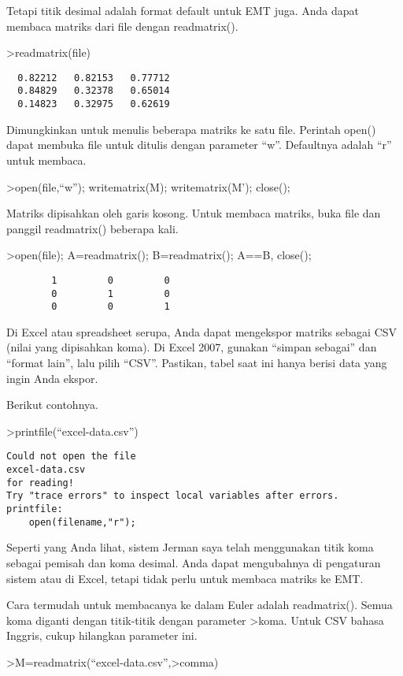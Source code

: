 \documentclass[
]{book}
\begin{document}
Tetapi titik desimal adalah format default untuk EMT juga. Anda dapat membaca matriks dari file dengan readmatrix().

\textgreater readmatrix(file)

\begin{verbatim}
  0.82212   0.82153   0.77712 
  0.84829   0.32378   0.65014 
  0.14823   0.32975   0.62619 
\end{verbatim}

Dimungkinkan untuk menulis beberapa matriks ke satu file. Perintah open() dapat membuka file untuk ditulis dengan parameter ``w''. Defaultnya adalah ``r'' untuk membaca.

\textgreater open(file,``w''); writematrix(M); writematrix(M'); close();

Matriks dipisahkan oleh garis kosong. Untuk membaca matriks, buka file dan panggil readmatrix() beberapa kali.

\textgreater open(file); A=readmatrix(); B=readmatrix(); A==B, close();

\begin{verbatim}
        1         0         0 
        0         1         0 
        0         0         1 
\end{verbatim}

Di Excel atau spreadsheet serupa, Anda dapat mengekspor matriks sebagai CSV (nilai yang dipisahkan koma). Di Excel 2007, gunakan ``simpan sebagai'' dan ``format lain'', lalu pilih ``CSV''. Pastikan, tabel saat ini hanya berisi data yang ingin Anda ekspor.

Berikut contohnya.

\textgreater printfile(``excel-data.csv'')

\begin{verbatim}
Could not open the file
excel-data.csv
for reading!
Try "trace errors" to inspect local variables after errors.
printfile:
    open(filename,"r");
\end{verbatim}

Seperti yang Anda lihat, sistem Jerman saya telah menggunakan titik koma sebagai pemisah dan koma desimal. Anda dapat mengubahnya di pengaturan sistem atau di Excel, tetapi tidak perlu untuk membaca matriks ke EMT.

Cara termudah untuk membacanya ke dalam Euler adalah readmatrix(). Semua koma diganti dengan titik-titik dengan parameter \textgreater koma. Untuk CSV bahasa Inggris, cukup hilangkan parameter ini.

\textgreater M=readmatrix(``excel-data.csv'',\textgreater comma)
\end{document}
